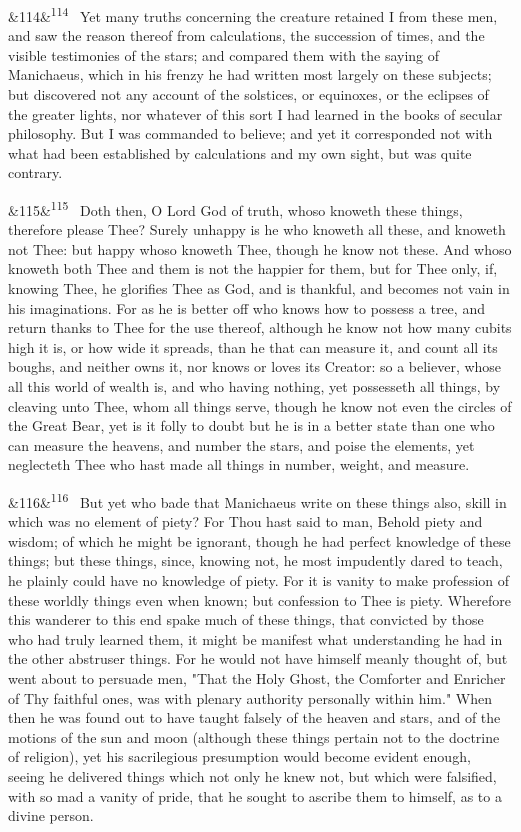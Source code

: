\documentclass[12pt]{article}
\newcommand{\para}[1][]{\par\noindent\ifx&#1&\else\textsuperscript{\footnotesize #1}~\fi}
\begin{document}
\para[114] Yet many truths concerning the creature retained I from these men, and saw the reason thereof from calculations, the succession of times, and the visible testimonies of the stars; and compared them with the saying of Manichaeus, which in his frenzy he had written most largely on these subjects; but discovered not any account of the solstices, or equinoxes, or the eclipses of the greater lights, nor whatever of this sort I had learned in the books of secular philosophy. But I was commanded to believe; and yet it corresponded not with what had been established by calculations and my own sight, but was quite contrary.

\para[115] Doth then, O Lord God of truth, whoso knoweth these things, therefore please Thee? Surely unhappy is he who knoweth all these, and knoweth not Thee: but happy whoso knoweth Thee, though he know not these. And whoso knoweth both Thee and them is not the happier for them, but for Thee only, if, knowing Thee, he glorifies Thee as God, and is thankful, and becomes not vain in his imaginations. For as he is better off who knows how to possess a tree, and return thanks to Thee for the use thereof, although he know not how many cubits high it is, or how wide it spreads, than he that can measure it, and count all its boughs, and neither owns it, nor knows or loves its Creator: so a believer, whose all this world of wealth is, and who having nothing, yet possesseth all things, by cleaving unto Thee, whom all things serve, though he know not even the circles of the Great Bear, yet is it folly to doubt but he is in a better state than one who can measure the heavens, and number the stars, and poise the elements, yet neglecteth Thee who hast made all things in number, weight, and measure.

\para[116] But yet who bade that Manichaeus write on these things also, skill in which was no element of piety? For Thou hast said to man, Behold piety and wisdom; of which he might be ignorant, though he had perfect knowledge of these things; but these things, since, knowing not, he most impudently dared to teach, he plainly could have no knowledge of piety. For it is vanity to make profession of these worldly things even when known; but confession to Thee is piety. Wherefore this wanderer to this end spake much of these things, that convicted by those who had truly learned them, it might be manifest what understanding he had in the other abstruser things. For he would not have himself meanly thought of, but went about to persuade men, "That the Holy Ghost, the Comforter and Enricher of Thy faithful ones, was with plenary authority personally within him." When then he was found out to have taught falsely of the heaven and stars, and of the motions of the sun and moon (although these things pertain not to the doctrine of religion), yet his sacrilegious presumption would become evident enough, seeing he delivered things which not only he knew not, but which were falsified, with so mad a vanity of pride, that he sought to ascribe them to himself, as to a divine person.
\end{document}
